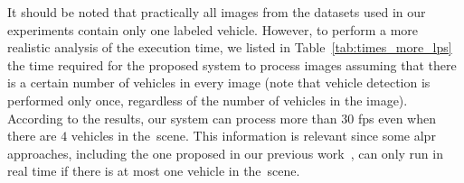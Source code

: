 \begin{table}[!htb]
	\centering
	\caption{The time required for each network in our system to process an input on an NVIDIA Titan Xp \acrshort*{gpu}.}
	\label{tab:times}
    
    \vspace{1mm}

\end{table}

It should be noted that practically all images from the datasets used in our experiments contain only one labeled vehicle.
However, to perform a more realistic analysis of the execution time, we listed in Table~\ref{tab:times_more_lps} the time required for the proposed system to process images assuming that there is a certain number of vehicles in every image (note that vehicle detection is performed only once, regardless of the number of vehicles in the image).
According to the results, our system can process more than $30$ \gls*{fps} even when there are $4$ vehicles in the~scene.
This information is relevant since some \gls*{alpr} approaches, including the one proposed in our previous work~\citep{laroca2018robust}, can only run in real time if there is at most one vehicle in the~scene.

\begin{table}[!htb]
    \centering
    \caption{Execution times considering that there is a certain number of vehicles in every image.}
    \label{tab:times_more_lps}
    
    \vspace{1mm}
    
    \end{table}

